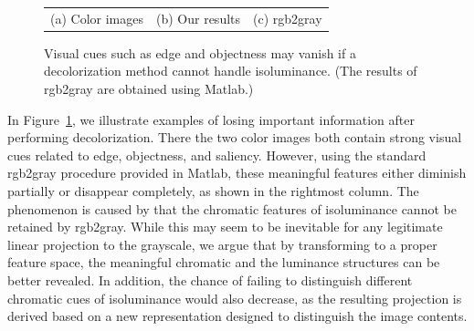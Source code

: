 \begin{figure}[t]
\begin{center}
\begin{tabular}{ccc}
(a) Color images & (b) Our results & (c) rgb2gray
\end{tabular} 	
\end{center}
\caption{Visual cues such as edge and objectness may vanish if 
a decolorization method cannot handle isoluminance. 
(The results of rgb2gray are obtained using Matlab.)}
\label{fig:intro}
\end{figure}

In Figure~\ref{fig:intro}, we illustrate examples of losing important information after
performing decolorization. 
There the two color images both contain strong visual cues related to edge,
objectness, and saliency. 
However, using the standard rgb2gray procedure provided in Matlab,
these meaningful features either diminish partially or disappear completely,
as shown in the rightmost column. 
The phenomenon is caused by that the chromatic features
of isoluminance cannot be retained by rgb2gray. 
While this may seem to be inevitable for any legitimate linear projection
to the grayscale, we argue that by transforming to a proper feature space,
the meaningful chromatic and the luminance structures can be better revealed.
In addition, the chance of failing to distinguish different chromatic 
cues of isoluminance would also decrease, 
as the resulting projection is derived based on a new representation designed 
to distinguish the image contents.

